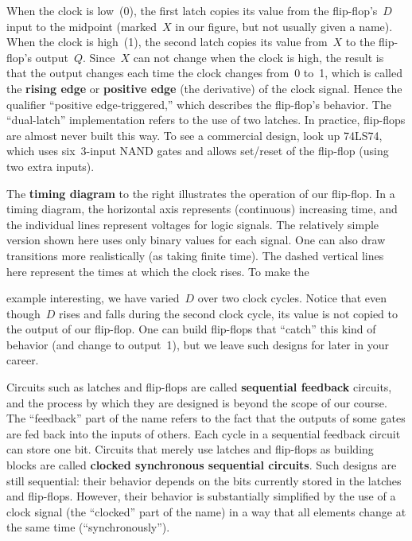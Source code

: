 When the clock is low~(0), the first latch copies its value from
the flip-flop's~$D$ input to the midpoint (marked~$X$ in our figure, but
not usually given a name).  When the clock is high~(1), the second
latch copies its value from~$X$ to the flip-flop's output~$Q$.
Since~$X$ can not change when the clock is high,
the result is that the output changes each time the clock changes
from~0 to~1, which is called the {\bf rising edge} or {\bf positive edge}
(the derivative) of the clock signal.  Hence the qualifier 
``positive edge-triggered,'' which describes the flip-flop's behavior.
%
%
The ``dual-latch'' implementation refers to the use of two 
latches.
In practice, flip-flops are almost never built this way.  To see a 
commercial design, look up 74LS74, which uses six~\mbox{3-input} NAND
gates and allows set/reset of the flip-flop (using two
extra inputs).


\begin{minipage}{3.55in}
The {\bf timing diagram} to the right illustrates the operation of
our flip-flop.  In a timing diagram, the horizontal axis represents
(continuous) increasing time, and the individual lines represent
voltages for logic signals.  The relatively simple version shown here
uses only binary values for each signal.  One can also draw 
transitions more realistically (as taking finite time).  The dashed
vertical lines here represent the times at which the clock rises.
To make the\linebreak
\end{minipage}\hspace{0.25in}%
\begin{minipage}{2.7in}
\vspace{12pt}
\end{minipage}\mpdone

example interesting, we have varied~$D$ over two clock
cycles.  Notice that even though~$D$ rises and falls during the second
clock cycle, its value is not copied to the output of our flip-flop.
One can build flip-flops that ``catch'' this kind of behavior
(and change to output~1), but we leave such designs for later in your
career.

Circuits such as latches and flip-flops are called {\bf sequential
feedback} circuits, and the process by which they are designed 
is beyond the scope of our course.  The ``feedback'' part of the
name refers to the fact that the outputs of some gates are fed back 
into the inputs of others.  Each cycle in a sequential feedback 
circuit can store one bit.
%
Circuits that merely use
latches and flip-flops as building blocks are called
{\bf clocked synchronous sequential circuits}.  Such designs are
still sequential: their behavior depends on the bits currently
stored in the latches and flip-flops.  However, their behavior
is substantially simplified by the use of a clock signal (the ``clocked''
part of the name) in a way that all elements change at the same
time (``synchronously'').

